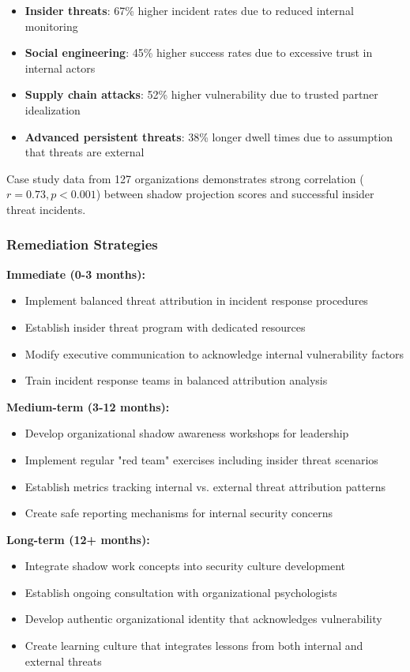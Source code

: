 \documentclass[11pt,a4paper]{article}
\begin{document}
\begin{itemize}
\item \textbf{Insider threats}: 67\% higher incident rates due to reduced internal monitoring
\item \textbf{Social engineering}: 45\% higher success rates due to excessive trust in internal actors
\item \textbf{Supply chain attacks}: 52\% higher vulnerability due to trusted partner idealization
\item \textbf{Advanced persistent threats}: 38\% longer dwell times due to assumption that threats are external
\end{itemize}

Case study data from 127 organizations demonstrates strong correlation ($r = 0.73, p < 0.001$) between shadow projection scores and successful insider threat incidents.

\subsubsection{Remediation Strategies}

\textbf{Immediate (0-3 months):}
\begin{itemize}
\item Implement balanced threat attribution in incident response procedures
\item Establish insider threat program with dedicated resources
\item Modify executive communication to acknowledge internal vulnerability factors
\item Train incident response teams in balanced attribution analysis
\end{itemize}

\textbf{Medium-term (3-12 months):}
\begin{itemize}
\item Develop organizational shadow awareness workshops for leadership
\item Implement regular "red team" exercises including insider threat scenarios
\item Establish metrics tracking internal vs. external threat attribution patterns
\item Create safe reporting mechanisms for internal security concerns
\end{itemize}

\textbf{Long-term (12+ months):}
\begin{itemize}
\item Integrate shadow work concepts into security culture development
\item Establish ongoing consultation with organizational psychologists
\item Develop authentic organizational identity that acknowledges vulnerability
\item Create learning culture that integrates lessons from both internal and external threats
\end{itemize}
\end{document}
